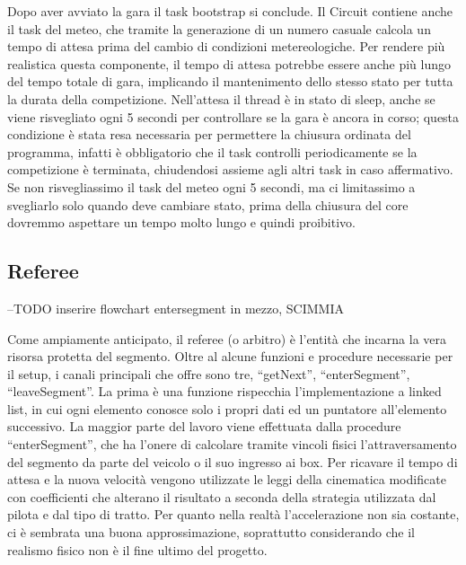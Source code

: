 Dopo aver avviato la gara il task bootstrap si conclude.
Il Circuit contiene anche il task del meteo, che tramite la generazione di un numero casuale calcola un tempo di attesa prima del cambio di condizioni metereologiche. Per rendere più realistica questa componente, il tempo di attesa potrebbe essere anche più lungo del tempo totale di gara, implicando il mantenimento dello stesso stato per tutta la durata della competizione. Nell’attesa il thread è in stato di sleep, anche se viene risvegliato ogni 5 secondi per controllare se la gara è ancora in corso; questa condizione è stata resa necessaria per permettere la chiusura ordinata del programma, infatti è obbligatorio che il task controlli periodicamente se la competizione è terminata, chiudendosi assieme agli altri task in caso affermativo. Se non risvegliassimo il task del meteo ogni 5 secondi, ma ci limitassimo a svegliarlo solo quando deve cambiare stato, prima della chiusura del core dovremmo aspettare un tempo molto lungo e quindi proibitivo.

\subsection{Referee}

--TODO inserire flowchart entersegment in mezzo, SCIMMIA

Come ampiamente anticipato, il referee (o arbitro) è l’entità che incarna la vera risorsa protetta del segmento. 
Oltre al alcune funzioni e procedure necessarie per il setup, i canali principali che offre sono tre, “getNext”, “enterSegment”, “leaveSegment”.
La prima è una funzione rispecchia l’implementazione a linked list, in cui ogni elemento conosce solo i propri dati ed un puntatore all’elemento successivo.
La maggior parte del lavoro viene effettuata dalla procedure “enterSegment”, che ha l’onere di calcolare tramite vincoli fisici l’attraversamento del segmento da parte del veicolo o il suo ingresso ai box.
Per ricavare il tempo di attesa e la nuova velocità vengono utilizzate le leggi della cinematica modificate con coefficienti che alterano il risultato a seconda della strategia utilizzata dal pilota e dal tipo di tratto. Per quanto nella realtà l’accelerazione non sia costante, ci è sembrata una buona approssimazione, soprattutto considerando che il realismo fisico non è il fine ultimo del progetto.

